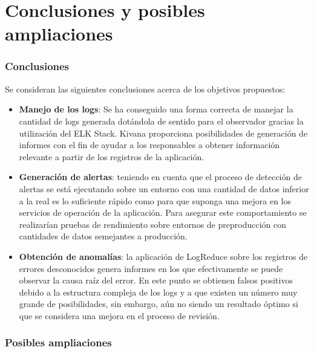\chapter{Conclusiones y posibles ampliaciones}

\subsection{Conclusiones}

Se consideran las siguientes conclusiones acerca de los objetivos propuestos:

\begin{itemize}

\item \textbf{Manejo de los logs}: Se ha conseguido una forma correcta de manejar la cantidad de logs generada dotándola de sentido para el observador gracias la utilización del ELK Stack. Kivana proporciona posibilidades de generación de informes con el fin de ayudar a los responsables a obtener información relevante a partir de los registros de la aplicación.

\item \textbf{Generación de alertas}: teniendo en cuenta que el proceso de detección de alertas se está ejecutando sobre un entorno con una cantidad de datos inferior a la real es lo suficiente rápido como para que suponga una mejora en los servicios de operación de la aplicación. Para asegurar este comportamiento se realizarían pruebas de rendimiento sobre entornos de preproducción con cantidades de datos semejantes a producción.

\item \textbf{Obtención de anomalías}: la aplicación de LogReduce sobre los registros de errores desconocidos genera informes en los que efectivamente se puede observar la causa raíz del error. En este punto se obtienen falsos positivos debido a la estructura compleja de los logs y a que existen un número muy grande de posibilidades, sin embargo, aún no siendo un resultado óptimo si que se considera una mejora en el proceso de revisión.

\end{itemize}


\subsection{Posibles ampliaciones}

